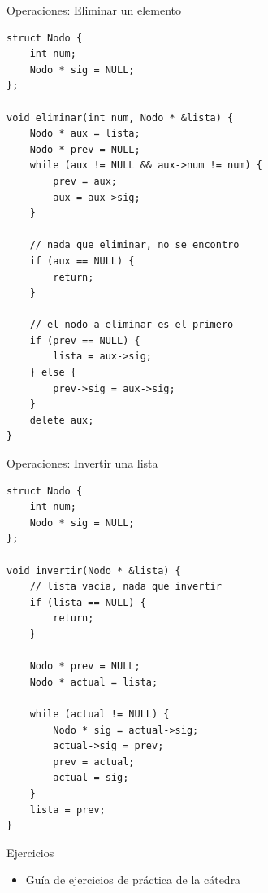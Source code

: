 \documentclass[12pt]{beamer}
\begin{document}
\begin{frame}[fragile]{Operaciones: Eliminar un elemento}
\begin{lstlisting}[basicstyle=\tiny]
struct Nodo {
    int num;
    Nodo * sig = NULL;
};

void eliminar(int num, Nodo * &lista) {
    Nodo * aux = lista;
    Nodo * prev = NULL;
    while (aux != NULL && aux->num != num) {
        prev = aux;
        aux = aux->sig;
    }

    // nada que eliminar, no se encontro
    if (aux == NULL) {
        return;
    }
    
    // el nodo a eliminar es el primero
    if (prev == NULL) {
        lista = aux->sig;
    } else {
        prev->sig = aux->sig;
    }
    delete aux;
}
\end{lstlisting}
\end{frame}

\begin{frame}[fragile]{Operaciones: Invertir una lista}
\begin{lstlisting}[basicstyle=\scriptsize]
struct Nodo {
    int num;
    Nodo * sig = NULL;
};

void invertir(Nodo * &lista) {
    // lista vacia, nada que invertir
    if (lista == NULL) {
        return;
    }

    Nodo * prev = NULL;
    Nodo * actual = lista;

    while (actual != NULL) {
        Nodo * sig = actual->sig;
        actual->sig = prev;
        prev = actual;
        actual = sig;
    }
    lista = prev;
}
\end{lstlisting}
\end{frame}

\begin{frame}{Ejercicios}
    \begin{itemize}
        \item Guía de ejercicios de práctica de la cátedra
    \end{itemize}
\end{frame}
\end{document}
